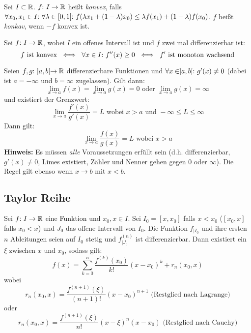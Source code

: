 \begin{frameddefn}
	Sei $I \subset \mathbb{R}$. $f{:}\  I \to \mathbb{R}$ heißt \textit{konvex}, falls $\forall x_0, x_1 \in I{:}\  \forall \lambda \in [0,1]{:}\  f(\lambda x_1 + (1-\lambda) x_0) \leq \lambda f(x_1) + (1-\lambda) f(x_0)$. $f$ heißt \textit{konkav}, wenn $-f$ konvex ist.
\end{frameddefn}

\begin{framedthm}
	Sei $f{:}\  I \to \mathbb{R}$, wobei $I$ ein offenes Intervall ist und $f$ zwei mal differenzierbar ist:
	\[
	f \textrm{ ist konvex } \iff\  \forall x \in I{:}\  f''(x) \geq 0 \ \iff\ f' \textrm{ ist monoton wachsend}
	\]
\end{framedthm}

\begin{framedthm}
	Seien $f,g {:}\  ]a,b[ \to \mathbb{R}$ differenzierbare Funktionen und $\forall x \in ]a,b[{:}\  g'(x) \neq 0$ (dabei ist $a=-\infty$ und $b=\infty$ zugelassen). Gilt dann:
	\[
	\lim\limits_{x \to a} f(x) = \lim\limits_{x \to a} g(x) = 0 \textrm{ oder } \lim\limits_{x \to a} g(x) = \infty
	\]
	und existiert der Grenzwert:
	\[
	\lim\limits_{x \to a} \frac{f'(x)}{g'(x)} = L \textrm{ wobei } x > a \textrm{ und } -\infty\leq L \leq \infty
	\]
	Dann gilt:
	\[
	\lim\limits_{x \to a} \frac{f(x)}{g(x)} = L \textrm{ wobei } x > a
	\]
	\textbf{Hinweis:} Es müssen \textit{alle} Voraussetzungen erfüllt sein (d.h. differenzierbar, $g'(x) \neq 0$, Limes existiert, Zähler und Nenner gehen gegen $0$ oder $\infty$). Die Regel gilt ebenso wenn $x \to b$ mit $x < b$.
\end{framedthm}

\newpage
\subsection{Taylor Reihe}

\begin{framedthm}
	Sei $f{:}\  I \to \mathbb{R}$ eine Funktion und $x_0, x \in I$. Sei $I_0 = [x, x_0]$ falls $x < x_0$ ($[x_0, x]$ falls $x_0 < x$) und $J_0$ das offene Intervall von $I_0$. Die Funktion $f_{|I_{0}}$ und ihre ersten $n$ Ableitungen seien auf $I_0$ stetig und $f^{(n)}_{|J_{0}}$ ist differenzierbar. Dann existiert ein $\xi$ zwischen $x$ und $x_0$, sodass gilt:
	\[
	f(x) = \sum^{n}_{k=0} \frac{f^{(k)}(x_0)}{k!} (x-x_0)^k + r_n(x_0, x)
	\]
	wobei
	\[
	r_n(x_0,x) = \frac{f^{(n+1)}(\xi)}{(n+1)!} (x-x_0)^{n+1} \textrm{ (Restglied nach Lagrange)}
	\]
	oder
	\[
	r_n(x_0,x) = \frac{f^{(n+1)}(\xi)}{n!} (x-\xi)^{n} (x-x_0) \textrm{ (Restglied nach Cauchy)}
	\]
\end{framedthm}

